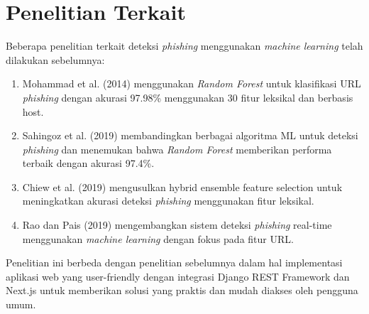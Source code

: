 \section{Penelitian Terkait}

Beberapa penelitian terkait deteksi \textit{phishing} menggunakan \textit{machine learning} telah dilakukan sebelumnya:

\begin{enumerate}
    \item Mohammad et al. (2014) menggunakan \textit{Random Forest} untuk klasifikasi URL \textit{phishing} dengan akurasi 97.98\% menggunakan 30 fitur leksikal dan berbasis host.
    
    \item Sahingoz et al. (2019) membandingkan berbagai algoritma ML untuk deteksi \textit{phishing} dan menemukan bahwa \textit{Random Forest} memberikan performa terbaik dengan akurasi 97.4\%.
    
    \item Chiew et al. (2019) mengusulkan hybrid ensemble feature selection untuk meningkatkan akurasi deteksi \textit{phishing} menggunakan fitur leksikal.
    
    \item Rao dan Pais (2019) mengembangkan sistem deteksi \textit{phishing} real-time menggunakan \textit{machine learning} dengan fokus pada fitur URL.
\end{enumerate}

Penelitian ini berbeda dengan penelitian sebelumnya dalam hal implementasi aplikasi web yang user-friendly dengan integrasi Django REST Framework dan Next.js untuk memberikan solusi yang praktis dan mudah diakses oleh pengguna umum.
